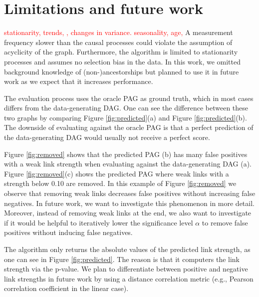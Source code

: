 \documentclass[conference]{IEEEtran}
\begin{document}



\section{Limitations and future work}
\textcolor{red}{stationarity, trends, , changes in variance. seasonality, age, }
A measurement frequency slower than the causal processes could violate the assumption of acyclicity of the graph. 
Furthermore, the algorithm is limited to stationarity processes and assumes no selection bias in the data.
In this work, we omitted background knowledge of (non-)ancestorships but planned to use it in future work as we expect that it increases performance.

The evaluation process uses the oracle PAG as ground truth, which in most cases differs from the data-generating DAG. One can see the difference between these two graphs by comparing Figure \ref{fig:predicted}(a) and Figure \ref{fig:predicted}(b). The downside of evaluating against the oracle PAG is that a perfect prediction of the data-generating DAG would usually not receive a perfect score.

Figure \ref{fig:removed} shows that the predicted PAG (b) has many false positives with a weak link strength when evaluating against the data-generating DAG (a). Figure \ref{fig:removed}(c) shows the predicted PAG where weak links with a strength below 0.10 are removed. In this example of Figure \ref{fig:removed} we observe that removing weak links decreases false positives without increasing false negatives. In future work, we want to investigate this phenomenon in more detail. Moreover, instead of removing weak links at the end, we also want to investigate if it would be helpful to iteratively lower the significance level $\alpha$ to remove false positives without inducing false negatives.

The algorithm only returns the absolute values of the predicted link strength, as one can see in Figure \ref{fig:predicted}. The reason is that it computers the link strength via the p-value. We plan to differentiate between positive and negative link strengths in future work by using a distance correlation metric (e.g., Pearson correlation coefficient in the linear case).
\end{document}
